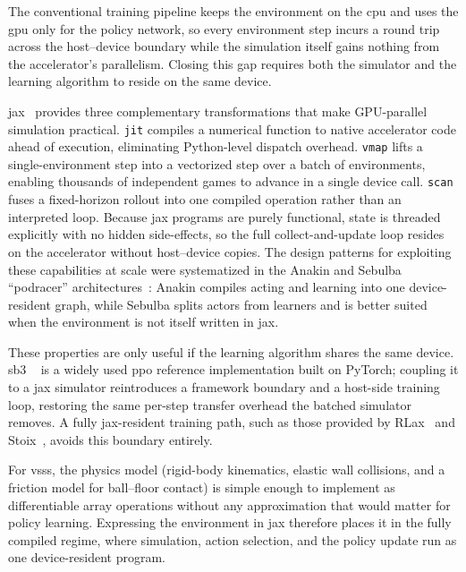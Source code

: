 The conventional training pipeline keeps the environment on the \gls{cpu} and
uses the \gls{gpu} only for the policy network, so every environment step
incurs a round trip across the host--device boundary while the simulation
itself gains nothing from the accelerator's parallelism.  Closing this gap
requires both the simulator and the learning algorithm to reside on the same
device.

\gls{jax}~\cite{jax2018github} provides three complementary transformations
that make GPU-parallel simulation practical.  \texttt{jit} compiles a
numerical function to native accelerator code ahead of execution, eliminating
Python-level dispatch overhead.  \texttt{vmap} lifts a single-environment step
into a vectorized step over a batch of environments, enabling thousands of
independent games to advance in a single device call.  \texttt{scan} fuses a
fixed-horizon rollout into one compiled operation rather than an interpreted
loop.  Because \gls{jax} programs are purely functional, state is threaded
explicitly with no hidden side-effects, so the full collect-and-update loop
resides on the accelerator without host--device copies.  The design patterns
for exploiting these capabilities at scale were systematized in the Anakin and
Sebulba ``podracer'' architectures~\cite{hessel2021podracer}: Anakin compiles
acting and learning into one device-resident graph, while Sebulba splits actors
from learners and is better suited when the environment is not itself written
in \gls{jax}.

These properties are only useful if the learning algorithm shares the same
device. \gls{sb3} ~\cite{raffin2021sb3} is a widely used \gls{ppo}
reference implementation built on PyTorch; coupling it to a \gls{jax}
simulator reintroduces a framework boundary and a host-side training loop,
restoring the same per-step transfer overhead the batched simulator removes.
A fully \gls{jax}-resident training path, such as those provided by
RLax~\cite{deepmind2020rlax} and Stoix~\cite{toledo2024stoix}, avoids this
boundary entirely.

For \gls{vsss}, the physics model (rigid-body kinematics, elastic wall
collisions, and a friction model for ball--floor contact) is simple enough to
implement as differentiable array operations without any approximation that
would matter for policy learning.  Expressing the environment in \gls{jax}
therefore places it in the fully compiled regime, where simulation, action
selection, and the policy update run as one device-resident program.
